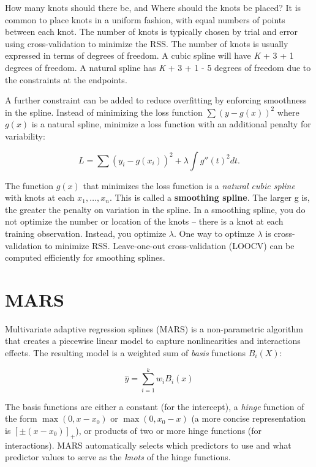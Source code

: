 \documentclass[]{book}
\begin{document}
How many knots should there be, and Where should the knots be placed? It is common to place knots in a uniform fashion, with equal numbers of points between each knot. The number of knots is typically chosen by trial and error using cross-validation to minimize the RSS. The number of knots is usually expressed in terms of degrees of freedom. A cubic spline will have \emph{K} + 3 + 1 degrees of freedom. A natural spline has \emph{K} + 3 + 1 - 5 degrees of freedom due to the constraints at the endpoints.

A further constraint can be added to reduce overfitting by enforcing smoothness in the spline. Instead of minimizing the loss function \(\sum{(y - g(x))^2}\) where \(g(x)\) is a natural spline, minimize a loss function with an additional penalty for variability:

\[L = \sum{(y_i - g(x_i))^2 + \lambda \int g''(t)^2dt}.\]

The function \(g(x)\) that minimizes the loss function is a \emph{natural cubic spline} with knots at each \(x_1, \dots, x_n\). This is called a \textbf{smoothing spline}. The larger g is, the greater the penalty on variation in the spline. In a smoothing spline, you do not optimize the number or location of the knots -- there is a knot at each training observation. Instead, you optimize \(\lambda\). One way to optimze \(\lambda\) is cross-validation to minimize RSS. Leave-one-out cross-validation (LOOCV) can be computed efficiently for smoothing splines.

\hypertarget{mars}{%
\section{MARS}\label{mars}}

Multivariate adaptive regression splines (MARS) is a non-parametric algorithm that creates a piecewise linear model to capture nonlinearities and interactions effects. The resulting model is a weighted sum of \emph{basis} functions \(B_i(X)\):

\[\hat{y} = \sum_{i=1}^{k}{w_iB_i(x)}\]

The basis functions are either a constant (for the intercept), a \emph{hinge} function of the form \(\max(0, x - x_0)\) or \(\max(0, x_0 - x)\) (a more concise representation is \([\pm(x - x_0)]_+\)), or products of two or more hinge functions (for interactions). MARS automatically selects which predictors to use and what predictor values to serve as the \emph{knots} of the hinge functions.
\end{document}
